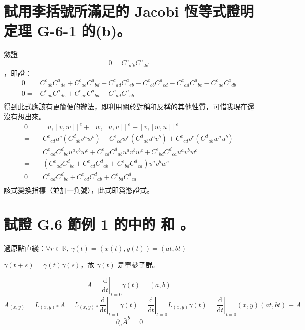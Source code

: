 \documentclass{article}
\begin{document}
\section{試用李括號所滿足的 Jacobi 恆等式證明定理 G-6-1 的(b)。}
\begin{framed}
  慾證 $$0 = {C^c}_{a[b}{C^a}_{de]}$$，即證：
  $$\begin{aligned}
      0 = & {C^c}_{ab}{C^a}_{de} + {C^c}_{ae}{C^a}_{bd} + {C^c}_{ad}{C^a}_{eb} - {C^c}_{ab}{C^a}_{ed} - {C^c}_{ad}{C^a}_{be} - {C^c}_{ae}{C^a}_{db} \\
      0 = & {C^c}_{ab}{C^a}_{de} + {C^c}_{ae}{C^a}_{bd} + {C^c}_{ad}{C^a}_{eb}                                                                      \\
    \end{aligned} $$
  得到此式應該有更簡便的辦法，即利用關於對稱和反稱的其他性質，可惜我現在還沒有想出來。
  $$\begin{aligned}
      0 = & {\left[ {u,\left[ {v,w} \right]} \right]^e} + {\left[ {w,\left[ {u,v} \right]} \right]^e} + {\left[ {v,\left[ {w,u} \right]} \right]^e}                            \\
      =   & {C^e}_{cd}{u^c}\left( {{C^d}_{ab}{v^a}{w^b}} \right) + {C^e}_{cd}{w^c}\left( {{C^d}_{ab}{u^a}{v^b}} \right) + {C^e}_{cd}{v^c}\left( {{C^d}_{ab}{w^a}{u^b}} \right) \\
      =   & {C^e}_{ad}{C^d}_{bc}{u^a}{v^b}{w^c} + {C^e}_{cd}{C^d}_{ab}{u^a}{v^b}{w^c} + {C^e}_{bd}{C^d}_{ca}{u^a}{v^b}{w^c}                                                    \\
      =   & \left( {{C^e}_{ad}{C^d}_{bc} + {C^e}_{cd}{C^d}_{ab} + {C^e}_{bd}{C^d}_{ca}} \right){u^a}{v^b}{w^c}                                                                 \\
      0 = & {C^e}_{ad}{C^d}_{bc} + {C^e}_{cd}{C^d}_{ab} + {C^e}_{bd}{C^d}_{ca}                                                                                                 \\
    \end{aligned} $$
  該式變換指標（並加一負號），此式即爲慾證式。
\end{framed}

\section{試證 G.6 節例 1 的中的  和 。}
\begin{framed}

  過原點直綫：$\forall r\in\mathbb{R},\ \gamma(t)=(x(t),y(t))=(at,bt)$

  $\gamma(t+s)=\gamma(t)\gamma(s)$，故 $\gamma(t)$ 是單參子群。


  $$
    A=\left.\frac{\mathrm{d}}{\mathrm{d}t}\right|_{t=0}\gamma(t)=(a,b)
  $$
  $$
    \bar{A}_{(x,y)}=L_{(x,y)*}A=L_{(x,y)*}\left.\frac{\mathrm{d}}{\mathrm{d}t}\right|_{t=0}\gamma(t)=\left.\frac{\mathrm{d}}{\mathrm{d}t}\right|_{t=0}L_{(x,y)}\gamma(t)=\left.\frac{\mathrm{d}}{\mathrm{d}t}\right|_{t=0}(x,y)(at,bt)\equiv A
  $$
  $$
    \partial_a\bar{A}^b=0
  $$
\end{framed}
\end{document}
